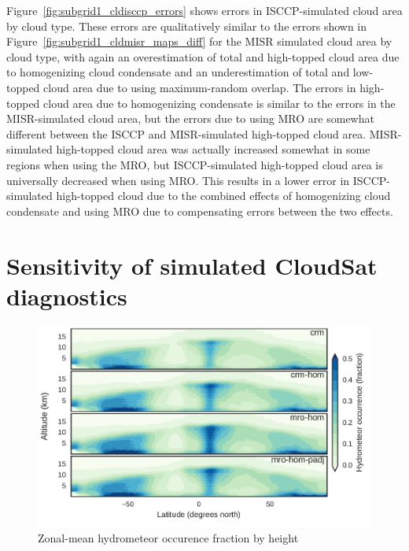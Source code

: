 Figure~\ref{fig:subgrid1_cldisccp_errors} shows errors in
ISCCP-simulated cloud area by cloud type. These errors are qualitatively
similar to the errors shown in
Figure~\ref{fig:subgrid1_cldmisr_maps_diff} for the MISR simulated cloud
area by cloud type, with again an overestimation of total and
high-topped cloud area due to homogenizing cloud condensate and an
underestimation of total and low-topped cloud area due to using
maximum-random overlap. The errors in high-topped cloud area due to
homogenizing condensate is similar to the errors in the MISR-simulated
cloud area, but the errors due to using MRO are somewhat different
between the ISCCP and MISR-simulated high-topped cloud area.
MISR-simulated high-topped cloud area was actually increased somewhat in
some regions when using the MRO, but ISCCP-simulated high-topped cloud
area is universally decreased when using MRO. This results in a lower
error in ISCCP-simulated high-topped cloud due to the combined effects
of homogenizing cloud condensate and using MRO due to compensating
errors between the two effects.

\section{Sensitivity of simulated CloudSat
diagnostics}\label{sensitivity-of-simulated-cloudsat-diagnostics}

\begin{figure}[htbp]
\centering
\includegraphics{graphics/subgrid1_hfba_zonal.pdf}
\caption{\label{fig:subgrid1_hfba_zonal}Zonal-mean hydrometeor occurence
fraction by height}\label{fig:subgrid1ux5fhfbaux5fzonal}
\end{figure}

